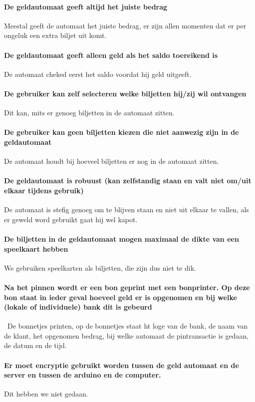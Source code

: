 \documentclass{article}
\begin{document}
	\paragraph{De geldautomaat geeft altijd het juiste bedrag}
Meestal geeft de automaat het juiste bedrag, er zijn allen momenten dat er per ongeluk een extra biljet uit komt.
	\paragraph{De geldautomaat geeft alleen geld als het saldo toereikend is}
De automaat cheked eerst het saldo voordat hij geld uitgeeft.
	\paragraph{De gebruiker kan zelf selecteren welke biljetten hij/zij wil ontvangen}
Dit kan, mits er genoeg biljetten in de automaat zitten.
	\paragraph{De gebruiker kan geen biljetten kiezen die niet aanwezig zijn in de geldautomaat}
De automaat houdt bij hoeveel biljetten er nog in de automaat zitten.
	\paragraph{De geldautomaat is robuust (kan zelfstandig staan en valt niet om/uit elkaar tijdens gebruik)}
De automaat is stefig genoeg om te blijven staan en niet uit elkaar te vallen, als er geweld word gebruikt gaat hij wel kapot.
	\paragraph{De biljetten in de geldautomaat mogen maximaal de dikte van een speelkaart hebben}
We gebruiken speelkarten als biljetten, die zijn dus niet te dik.
	\paragraph{Na het pinnen wordt er een bon geprint met een bonprinter. Op deze bon staat in ieder geval hoeveel geld er is opgenomen en bij welke (lokale of individuele) bank dit is gebeurd}\
De bonnetjes printen, op de bonnetjes staat ht loge van de bank, de naam van de klant, het opgenomen bedrag, bij welke automaat de pintransactie is gedaan, de datum en de tijd.
	\paragraph{Er moet encryptie gebruikt worden tussen de geld automaat en de server en tussen de arduino en de computer.}
Dit hebben we niet gedaan.
\end{document}
